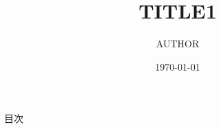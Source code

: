 \documentclass[autodetect-engine,dvipdfmx-if-dvi,ja=standard,a4paper,12pt]{beamer}
\title{TITLE1}
\author{AUTHOR}
\date{\today}
\begin{document}
\frame{\maketitle}

\begin{frame}{目次}
  \tableofcontents
\end{frame}



\end{document}
